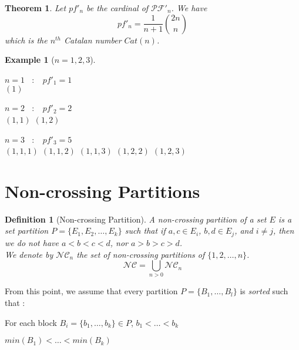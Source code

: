 \documentclass[12pt]{report}
\newtheorem{theorem}{Theorem}
\newtheorem{definition}{Definition}
\newtheorem*{example}{Example}
\begin{document}
\begin{theorem}
    Let $pf'_n$ be the cardinal of $\mathcal{PF'}_n$.
    We have $$pf'_n = \frac{1}{n + 1} \binom{2n}{n}$$
    which is the $n^{th}$ Catalan number $Cat(n)$.
\end{theorem}

\begin{example}[$n = 1, 2, 3$]
    ~\\
    \begin{itemize*}
        \item $n = 1$ \  $:$ \  $pf'_1 = 1$\\
        \subitem $(1)$\\
        \item $n = 2$ \  $:$ \  $pf'_2 = 2$\\
        \subitem $(1, 1)$
        \subitem $(1, 2)$\\
        \item $n = 3$ \  $:$ \  $pf'_3 = 5$\\
        \subitem $(1, 1, 1)$
        \subitem $(1, 1, 2)$
        \subitem $(1, 1, 3)$
        \subitem $(1, 2, 2)$
        \subitem $(1, 2, 3)$\\
    \end{itemize*}
\end{example}

\section{Non-crossing Partitions}

\begin{definition}[Non-crossing Partition]
    A \emph{non-crossing partition} of a set $E$ is
    a set partition $P = \{E_1, E_2, \ldots, E_k\}$ such that
    if $a, c \in E_i$, $b, d \in E_j$, and $i \neq j$, then
    we do \emph{not} have $a < b < c < d$, nor $a > b > c > d$.\\
    We denote by $\mathcal{NC}_n$ the set of non-crossing partitions
    of $\{1, 2, \ldots, n\}$.
    $$\mathcal{NC} = \bigcup_{n > 0}{\mathcal{NC}_n}$$
\end{definition}

From this point, we assume that every partition $P = \{B_1, \ldots, B_l\}$
is \emph{sorted} such that :\\
\begin{itemize*}
    \item For each block $B_i = \{b_1, \ldots, b_k\} \in P$,
        $b_1 < \ldots < b_k$\\
    \item $min (B_1) < \ldots < min (B_k)$\\
\end{itemize*}
\end{document}
